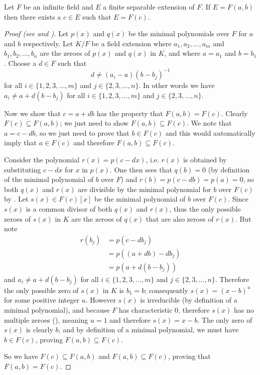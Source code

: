 \begin{lemma}\label{lemma-primitive-element}
    Let $F$ be an infinite field and $E$ a finite separable extension of $F$. If $E = F(a, b)$ then there exists a $c \in E$ such that $E = F(c)$.
\end{lemma}
\begin{proof}[Proof (see {\cite[Theorem 21.6]{gallian_2016}} and {\cite[Theorem 23.13]{judson_beezer_2022}})]
    Let $p(x)$ and $q(x)$ be the minimal polynomials over $F$ for $a$ and $b$ respectively. Let $K/F$ be a field extension where $a_1, a_2, \dots, a_m$ and $b_1, b_2, \dots, b_n$ are the zeroes of $p(x)$ and $q(x)$ in $K$, and where $a = a_1$ and $b = b_1$. Choose a $d \in F$ such that
    \[
        d \neq (a_i-a)(b-b_j)^{-1}
    \]
    for all $i \in \{1, 2, 3, \dots, m\}$ and $j \in \{2, 3, \dots, n\}$. In other words we have $a_i \neq a + d(b-b_j)$ for all $i \in \{1, 2, 3, \dots, m\}$ and $j \in \{2, 3, \dots, n\}$.

    Now we show that $c = a + db$ has the property that $F(a, b) = F(c)$. Clearly $F(c) \subseteq F(a, b)$; we just need to show $F(a, b) \subseteq F(c)$. We note that $a = c - db$, so we just need to prove that $b \in F(c)$ and this would automatically imply that $a \in F(c)$ and therefore $F(a,b) \subseteq F(c)$.

    Consider the polynomial $r(x) = p(c - dx)$, i.e. $r(x)$ is obtained by substituting $c - dx$ for $x$ in $p(x)$. One then sees that $q(b) = 0$ (by definition of the minimal polynomial of $b$ over $F$) and $r(b) = p(c - db) = p(a) = 0$, so both $q(x)$ and $r(x)$ are divisible by the minimal polynomial for $b$ over $F(c)$ by . Let $s(x) \in F(c)[x]$ be the minimal polynomial of $b$ over $F(c)$. Since $s(x)$ is a common divisor of both $q(x)$ and $r(x)$, thus the only possible zeroes of $s(x)$ in $K$ are the zeroes of $q(x)$ that are also zeroes of $r(x)$. But note
    \begin{align*}
        r(b_j) &= p(c-db_j)\\
        &= p((a+db) - db_j)\\
        &= p(a+d(b-b_j))
    \end{align*}
    and $a_i \neq a+d(b-b_j)$ for all $i \in \{1, 2, 3, \dots, m\}$ and $j \in \{2, 3, \dots, n\}$. Therefore the only possible zero of $s(x)$ in $K$ is $b_1 = b$; consequently $s(x) = (x-b)^u$ for some positive integer $u$. However $s(x)$ is irreducible (by definition of a minimal polynomial), and because $F$ has characteristic 0, therefore $s(x)$ has no multiple zeroes (), meaning $u = 1$ and therefore $s(x) = x-b$. The only zero of $s(x)$ is clearly $b$, and by definition of a minimal polynomial, we must have $b \in F(c)$, proving $F(a, b) \subseteq F(c)$.

    So we have $F(c) \subseteq F(a, b)$ and $F(a, b) \subseteq F(c)$, proving that $F(a, b) = F(c)$.
\end{proof}

